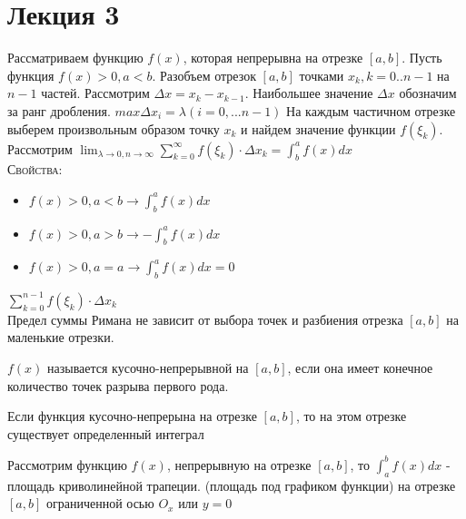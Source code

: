 \chapter{Лекция 3}
    \begin{definition}
        Рассматриваем функцию $f(x)$, которая непрерывна на отрезке $[a,b]$. Пусть функция $f(x) > 0, a < b$. Разобъем отрезок $[a,b]$ точками $x_k, k = 0 .. n-1$
        на $n-1$ частей. Рассмотрим $\Delta x = x_k - x_{k-1}$. Наибольшее значение $\Delta x $ обозначим за ранг дробления. $max \Delta x_i = \lambda (i = 0, ... n-1)$
        На каждым частичном отрезке выберем произвольным образом точку $x_k$ и найдем значение функции $f(\xi_k)$. 
        Рассмотрим $\lim_{\lambda \rightarrow 0, n \rightarrow \infty} \sum^{\infty}_{k=0} f(\xi_k)\cdot \Delta x_k  = \int^{a}_b f(x) dx$ \\ 
        \textsc{Свойства: }
        \begin{itemize}
            \item $f(x) > 0, a<b \rightarrow \int^a_b f(x)dx$
            \item $f(x) > 0, a >b \rightarrow -\int^a_b f(x) dx $ 
            \item $f(x) >0, a=a \rightarrow \int^a_b f(x) dx = 0$
        \end{itemize}
    
    \end{definition}

    \begin{definition}
        $\sum^{n-1}_{k=0} f(\xi_k)\cdot \Delta x_k $ \\ 
        Предел суммы Римана не зависит от выбора точек и разбиения отрезка $[a,b]$ на маленькие отрезки.
    \end{definition}
    
    \begin{theorem}
        $f(x)$ называется кусочно-непрерывной на $[a,b]$, если она имеет конечное количество точек разрыва первого рода.
    \end{theorem}

    \begin{theorem}
        Если функция кусочно-непрерына на отрезке $[a,b]$, то на этом отрезке существует определенный интеграл 
    \end{theorem}

    \begin{definition}
        Рассмотрим функцию $f(x)$, непрерывную на отрезке $[a,b]$, то $\int^b_a f(x) dx $ - площадь криволинейной трапеции. (площадь под графиком функции) на отрезке $[a,b]$ ограниченной осью $O_x $ или $y=0$
    \end{definition}

